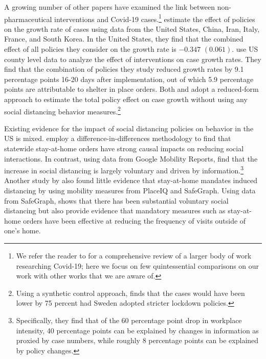 \documentclass[11pt,reqno,letter]{amsart}
\theoremstyle{definition}
\begin{document}
%
%



A growing number of other papers have examined the link between non-pharmaceutical interventions and Covid-19  cases.\footnote{We refer the reader to \cite{avery2020} for a comprehensive review of  a larger body of work researching Covid-19; here we focus on few quintessential comparisons on our work with other works that we are aware of.} \cite{hsiang2020} estimate the effect of policies on the growth rate of cases using
data from the United States, China, Iran, Italy, France, and South
Korea. In the United States, they find that the combined effect of all policies they consider on the
growth rate is $-0.347$ $(0.061)$. \cite{courtemanche2020} use US county level data to analyze the effect
of interventions on case growth rates. They find that the combination
of policies they study reduced growth rates by 9.1 percentage points
16-20 days after implementation, out of which 5.9 percentage points are attributable to shelter in place orders. Both \cite{hsiang2020} and \cite{courtemanche2020} adopt a reduced-form approach to estimate the total policy effect on case growth without using any social distancing behavior measures.\footnote{Using
a synthetic control approach, \cite{cho2020} finds that  the cases would have been lower by 75 percent  had Sweden adopted stricter lockdown policies.}

Existing evidence for the impact of social distancing policies on behavior in the US is mixed.
\cite{abouk2020} employ a difference-in-differences methodology to  find that statewide stay-at-home orders  have  strong causal impacts on reducing social interactions. In contrast, using data from Google Mobility Reports,
\cite{maloney2020}  find that the increase in social distancing is
largely voluntary and driven by information.\footnote{Specifically, they find
that of the 60 percentage point drop in workplace intensity, 40
percentage points can be explained by changes in information as
proxied by case numbers, while roughly 8 percentage points can be
explained by policy changes.} Another study by  \cite{gupta2020} also found little evidence that stay-at-home mandates induced distancing by
using mobility measures from PlaceIQ and SafeGraph. Using data from SafeGraph, \cite{anderson2020} shows that there has been substantial voluntary social distancing but also provide evidence that mandatory measures such as stay-at-home orders have  been effective at reducing the frequency of visits  outside of one's home.
\end{document}
